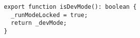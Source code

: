 \begin{verbatim}
export function isDevMode(): boolean {
  _runModeLocked = true;
  return _devMode;
}
\end{verbatim}
